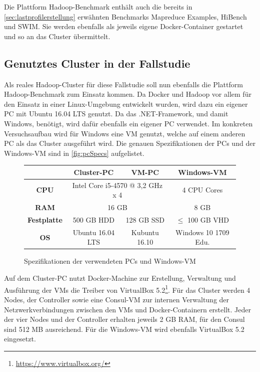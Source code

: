 Die Plattform Hadoop-Benchmark enthält auch die bereits in \autoref{sec:lastprofilerstellung} erwähnten Benchmarks Mapreduce Examples, HiBench und SWIM. Sie werden ebenfalls als jeweils eigene Docker-Container gestartet und so an das Cluster übermittelt.

\subsection{Genutztes Cluster in der Fallstudie}\label{sec:clusterFallstudie}

Als reales Hadoop-Cluster für diese Fallstudie soll nun ebenfalls die Plattform Hadoop-Benchmark zum Einsatz kommen. Da Docker und Hadoop vor allem für den Einsatz in einer Linux-Umgebung entwickelt wurden, wird dazu ein eigener PC mit Ubuntu 16.04 LTS genutzt. Da \sS das .NET-Framework, und damit Windows, benötigt, wird dafür ebenfalls ein eigener PC verwendet. Im konkreten Versuchsaufbau wird für Windows eine VM genutzt, welche auf einem anderen PC als das Cluster ausgeführt wird. Die genauen Spezifikationen der PCs und der Windows-VM sind in \autoref{fig:pcSpecs} aufgelistet.

\begin{figure}
    \centering
    \begin{tabular}{|c|c|c|c|}
    	\hline
    	     \textbf{}      & \textbf{Cluster-PC} &         \textbf{VM-PC}          & \textbf{Windows-VM}  \\ \hline\hline
    	   \textbf{CPU}     & \multicolumn{2}{c|}{Intel Core i5-4570 @ 3,2 GHz x 4} &     4 CPU Cores      \\ \hline
    	   \textbf{RAM}     &              \multicolumn{2}{c|}{16 GB}               &         8 GB         \\ \hline
    	\textbf{Festplatte} &     500 GB HDD      &           128 GB SSD            &  $\leq$ 100 GB VHD   \\ \hline
    	    \textbf{OS}     &  Ubuntu 16.04 LTS   &          Kubuntu 16.10          & Windows 10 1709 Edu. \\ \hline
    \end{tabular}
    \caption{Spezifikationen der verwendeten PCs und Windows-VM}
    \label{fig:pcSpecs}
\end{figure}

Auf dem Cluster-PC nutzt Docker-Machine zur Erstellung, Verwaltung und Ausführung der VMs die Treiber von VirtualBox 5.2\footnote{\url{https://www.virtualbox.org/}}. Für das Cluster werden 4 Nodes, der Controller sowie eine Consul-VM zur internen Verwaltung der Netzwerkverbindungen zwischen den VMs und Docker-Containern erstellt. Jeder der vier Nodes und der Controller erhalten jeweils 2 GB RAM, für den Consul sind 512 MB ausreichend. Für die Windows-VM wird ebenfalls VirtualBox 5.2 eingesetzt.

